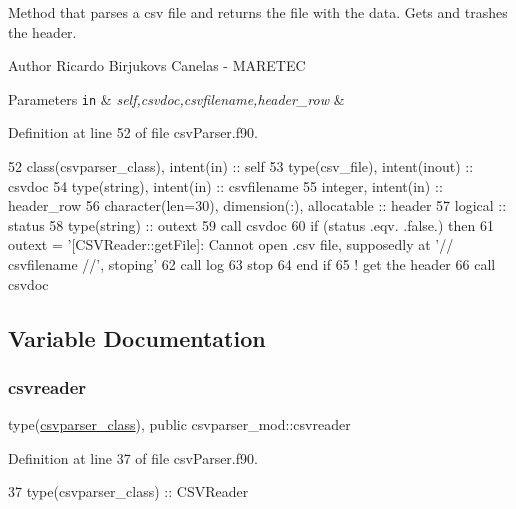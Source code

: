 Method that parses a csv file and returns the file with the data. Gets and trashes the header. 

\begin{DoxyAuthor}{Author}
Ricardo Birjukovs Canelas -\/ M\+A\+R\+E\+T\+EC 
\end{DoxyAuthor}

\begin{DoxyParams}[1]{Parameters}
\mbox{\tt in}  & {\em self,csvdoc,csvfilename,header\+\_\+row} & \\
\hline
\end{DoxyParams}


Definition at line 52 of file csv\+Parser.\+f90.


\begin{DoxyCode}
52     \textcolor{keywordtype}{class}(csvparser\_class), \textcolor{keywordtype}{intent(in)} :: self
53     \textcolor{keywordtype}{type}(csv\_file), \textcolor{keywordtype}{intent(inout)} :: csvdoc
54     \textcolor{keywordtype}{type}(string), \textcolor{keywordtype}{intent(in)} :: csvfilename
55     \textcolor{keywordtype}{integer}, \textcolor{keywordtype}{intent(in)} :: header\_row
56     \textcolor{keywordtype}{character(len=30)}, \textcolor{keywordtype}{dimension(:)}, \textcolor{keywordtype}{allocatable} :: header
57     \textcolor{keywordtype}{logical} :: status
58     \textcolor{keywordtype}{type}(string) :: outext
59     \textcolor{keyword}{call }csvdoc%
60     \textcolor{keywordflow}{if} (status .eqv. .false.) \textcolor{keywordflow}{then}
61         outext = \textcolor{stringliteral}{'[CSVReader::getFile]: Cannot open .csv file, supposedly at '}// csvfilename //\textcolor{stringliteral}{', stoping'}
62         \textcolor{keyword}{call }log%
63         stop
64 \textcolor{keywordflow}{    end if}
65     \textcolor{comment}{! get the header}
66     \textcolor{keyword}{call }csvdoc%
\end{DoxyCode}


\subsection{Variable Documentation}
\mbox{\label{namespacecsvparser__mod_ab6217ec53c20650314f678ba29d4c105}} 
\subsubsection{\texorpdfstring{csvreader}{csvreader}}
{\footnotesize\ttfamily type(\mbox{\hyperlink{structcsvparser__mod_1_1csvparser__class}{csvparser\+\_\+class}}), public csvparser\+\_\+mod\+::csvreader}



Definition at line 37 of file csv\+Parser.\+f90.


\begin{DoxyCode}
37     \textcolor{keywordtype}{type}(csvparser\_class) :: CSVReader
\end{DoxyCode}
